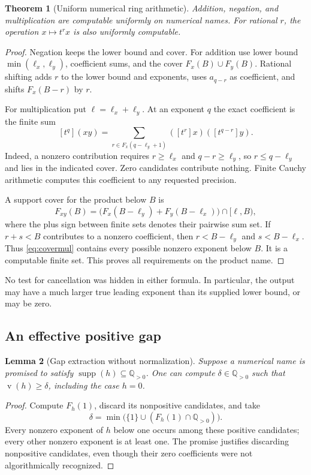 \documentclass[11pt,letterpaper]{article}
\numberwithin{equation}{section}
\newtheorem{theorem}{Theorem}[section]
\newtheorem{lemma}[theorem]{Lemma}
\theoremstyle{definition}
\theoremstyle{remark}
\newcommand{\Q}{\mathbb Q}
\newcommand{\supp}{\operatorname{supp}}
\newcommand{\val}{\operatorname{v}}
\newcommand{\coef}[2]{[t^{#1}]#2}
\begin{document}
\begin{theorem}[Uniform numerical ring arithmetic]
\label{thm:ring}
Addition, negation, and multiplication are computable uniformly on
numerical names. For rational $r$, the operation $x\mapsto t^rx$ is also
uniformly computable.
\end{theorem}
\begin{proof}
Negation keeps the lower bound and cover. For addition use lower bound
$\min(\ell_x,\ell_y)$, coefficient sums, and the cover
$F_x(B)\cup F_y(B)$. Rational shifting adds $r$ to the lower bound and
exponents, uses $a_{q-r}$ as coefficient, and shifts $F_x(B-r)$ by $r$.

For multiplication put $\ell=\ell_x+\ell_y$. At an exponent $q$ the exact
coefficient is the finite sum
\begin{equation}\label{eq:coeffmul}
 \coef q{(xy)}=
 \sum_{r\in F_x(q-\ell_y+1)} (\coef rx)(\coef{q-r}y).
\end{equation}
Indeed, a nonzero contribution requires $r\ge\ell_x$ and
$q-r\ge\ell_y$, so $r\le q-\ell_y$ and lies in the indicated cover.
Zero candidates contribute nothing. Finite Cauchy arithmetic computes this
coefficient to any requested precision.

A support cover for the product below $B$ is
\begin{equation}\label{eq:covermul}
 F_{xy}(B)=
 \bigl(F_x(B-\ell_y)+F_y(B-\ell_x)\bigr)\cap[\ell,B),
\end{equation}
where the plus sign between finite sets denotes their pairwise sum set.
If $r+s<B$ contributes to a nonzero coefficient, then
$r<B-\ell_y$ and $s<B-\ell_x$. Thus \eqref{eq:covermul} contains every
possible nonzero exponent below $B$. It is a computable finite set. This
proves all requirements on the product name.
\end{proof}

No test for cancellation was hidden in either formula. In particular, the
output may have a much larger true leading exponent than its supplied
lower bound, or may be zero.

\subsection{An effective positive gap}

\begin{lemma}[Gap extraction without normalization]
\label{lem:gap}
Suppose a numerical name is promised to satisfy
$\supp(h)\subseteq\Q_{>0}$. One can compute $\delta\in\Q_{>0}$ such that
$\val(h)\ge\delta$, including the case $h=0$.
\end{lemma}
\begin{proof}
Compute $F_h(1)$, discard its nonpositive candidates, and take
\[
 \delta=\min\bigl(\{1\}\cup(F_h(1)\cap\Q_{>0})\bigr).
\]
Every nonzero exponent of $h$ below one occurs among these positive
candidates; every other nonzero exponent is at least one. The promise
justifies discarding nonpositive candidates, even though their zero
coefficients were not algorithmically recognized.
\end{proof}
\end{document}
